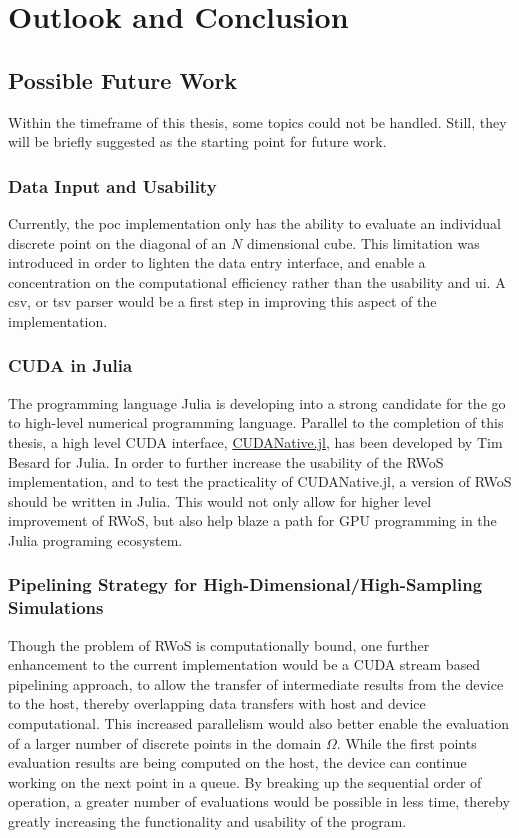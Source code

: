 \chapter{Outlook and Conclusion}
\label{chapter:outlook_and_conclusion}
\section{Possible Future Work}
Within the timeframe of this thesis, some topics could not be handled.  Still,
they will be briefly suggested as the starting point for future work.
\subsection{Data Input and Usability}
Currently, the \gls{poc} implementation only has the ability to evaluate an individual discrete point
on the diagonal of an $N$ dimensional cube.  This limitation was introduced in order
to lighten the data entry interface, and enable a concentration on the computational
efficiency rather than the usability and \gls{ui}.  A csv, or tsv parser would be a first step in
improving this aspect of the implementation.
\subsection{CUDA in Julia}
The programming language Julia is developing into a strong candidate for the go
to high-level numerical programming language.  Parallel to the completion of this
thesis, a high level CUDA interface, \href{https://github.com/JuliaGPU/CUDAnative.jl}
{CUDANative.jl}, has been developed by Tim Besard for Julia. In order to further increase the
usability of the \Gls{RWoS} implementation, and to test the practicality of CUDANative.jl,
a version of \Gls{RWoS} should be written in Julia.  This would not only allow
for higher level improvement of \Gls{RWoS}, but also help blaze a path for
GPU programming in the Julia programing ecosystem.

\subsection{Pipelining Strategy for High-Dimensional/High-Sampling Simulations}
Though the problem of \Gls{RWoS} is computationally bound, one further enhancement
to the current implementation would be a CUDA stream based pipelining approach,
to allow the transfer of intermediate results from the device to the host,
thereby overlapping data transfers with host and device computational.  This increased
parallelism would also better enable the evaluation of a larger number of discrete
 points in the domain $\Omega$.  While the first points evaluation results are being
 computed on the host, the device can continue working on the next point in a queue.
 By breaking up the sequential order of operation, a greater number of evaluations
 would be possible in less time, thereby greatly increasing the functionality and
 usability of the program.
